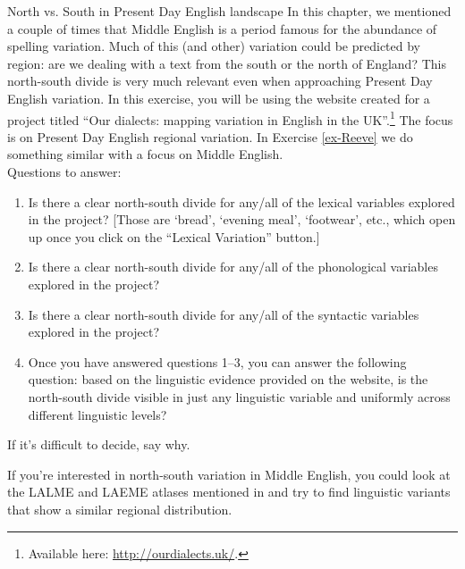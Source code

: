 \begin{exercises}{North vs. South in Present Day English landscape}\label{ex-North}
In this chapter, we mentioned a couple of times that Middle English is a period famous for the abundance of spelling variation. Much of this (and other) variation could be predicted by region: are we dealing with a text from the south or the north of England? This north-south divide is very much relevant even when approaching Present Day English variation. In this exercise, you will be using the website created for a project titled ``Our dialects: mapping variation in English in the UK''.\footnote{Available here: \url{http://ourdialects.uk/}.} The focus is on Present Day English regional variation. In Exercise \ref{ex-Reeve} we do something similar with a focus on Middle English.\\

\noindent Questions to answer:
\begin{enumerate}
\item Is there a clear north-south divide for any/all of the lexical variables explored in the project? [Those are `bread', `evening meal', `footwear', etc., which open up once you click on the ``Lexical Variation'' button.]
\item Is there a clear north-south divide for any/all of the phonological variables explored in the project?
\item Is there a clear north-south divide for any/all of the syntactic variables explored in the project?
\item Once you have answered questions 1--3, you can answer the following question: based on the linguistic evidence provided on the website, is the north-south divide visible in just any linguistic variable and uniformly across different linguistic levels?
\end{enumerate}

\noindent If it's difficult to decide, say why.\\

\chili{}

\noindent If you're interested in north-south variation in Middle English, you could look at the LALME and LAEME atlases mentioned in  and try to find linguistic variants that show a similar regional distribution.

\end{exercises}


